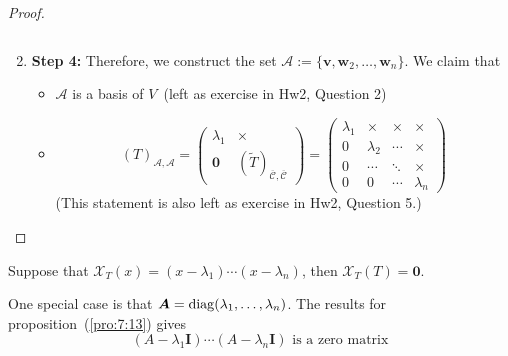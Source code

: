 \begin{proof}
\begin{enumerate}
\[\]
\item
\textbf{Step 4:}
Therefore, we construct the set $\mathcal{A}:=
\{\bm v,\bm w_2,\dots,\bm w_n\}$.
We claim that 
\begin{itemize}
\item
$\mathcal{A}$ is a basis of $V$~(left as exercise in Hw2, Question 2)
\item
\[
(T)_{\mathcal{A},\mathcal{A}}=\begin{pmatrix}
\lambda_1&\times\\\bm0&(\tilde{T})_{\overline{\mathcal{C}},\overline{\mathcal{C}}}
\end{pmatrix}=\begin{pmatrix}
\lambda_1&\times&\times&\times\\
0&\lambda_2&\cdots&\times\\
0&\cdots&\ddots&\times\\
0&0&\cdots&\lambda_n
\end{pmatrix}
\]
(This statement is also left as exercise in Hw2, Question 5.)
\end{itemize}
\end{enumerate}
\end{proof}

\begin{proposition}\label{pro:7:13}
Suppose that $\mathcal{X}_T(x) = (x-\lambda_1)\cdots(x-\lambda_n)$, then $\mathcal{X}_T(T)=\bm0$.
\end{proposition}
\begin{remark}
One special case is that $\bm A = \operatorname{diag}(\lambda_1,\dots,\lambda_n)$.
The results for proposition~(\ref{pro:7:13}) gives
\[
(A-\lambda_1\bm I)\cdots(A-\lambda_n\bm I)\text{ is a zero matrix}
\]
\end{remark}

















